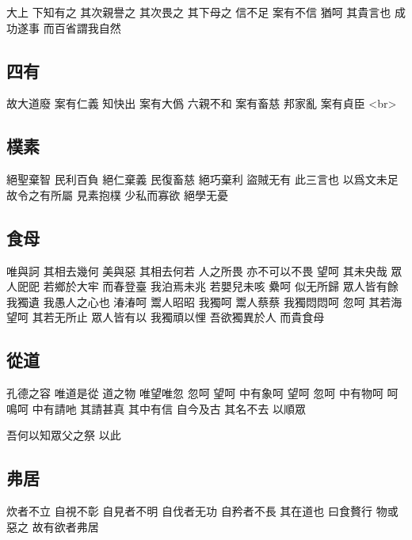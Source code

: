 \documentclass[a5paper,zihao=-4,oneside,UTF8]{ctexart}
\begin{document}
大上 下知有之 其次親譽之 其次畏之 其下母之 
信不足 案有不信 猶呵 其貴言也 
成功遂事 而百省謂我自然




\subsection{四有}



故大道廢 案有仁義 
知快出 案有大僞 
六親不和 案有畜慈 
邦家亂 案有貞臣 
<br> 



\subsection{樸素}



絕聖棄智 民利百負 
絕仁棄義 民復畜慈 
絕巧棄利 盜賊无有 
此三言也 以爲文未足 故令之有所屬 
見素抱樸 少私而寡欲 絕學无憂 

\subsection{食母}



唯與訶 其相去幾何 美與惡 其相去何若 
人之所畏 亦不可以不畏 
望呵 其未央哉 
眾人巸巸 若鄉於大牢 而春登臺 
我泊焉未兆 若嬰兒未咳 纍呵 似无所歸 
眾人皆有餘 我獨遺 我愚人之心也 湷湷呵 鬻人昭昭 我獨呵 鬻人蔡蔡 我獨悶悶呵 
忽呵 其若海 望呵 其若无所止 
眾人皆有以 我獨頑以悝 吾欲獨異於人 而貴食母 



\subsection{從道}



孔德之容 唯道是從 道之物 唯望唯忽 
忽呵 望呵 中有象呵 望呵 忽呵 中有物呵 呵 鳴呵 中有請吔 其請甚真 其中有信 
自今及古 其名不去 以順眾

吾何以知眾父之祭 以此 



\subsection{弗居}



炊者不立 自視不彰 
自見者不明 自伐者无功 自矜者不長 
其在道也 曰食贅行 
物或惡之 故有欲者弗居 
\end{document}
